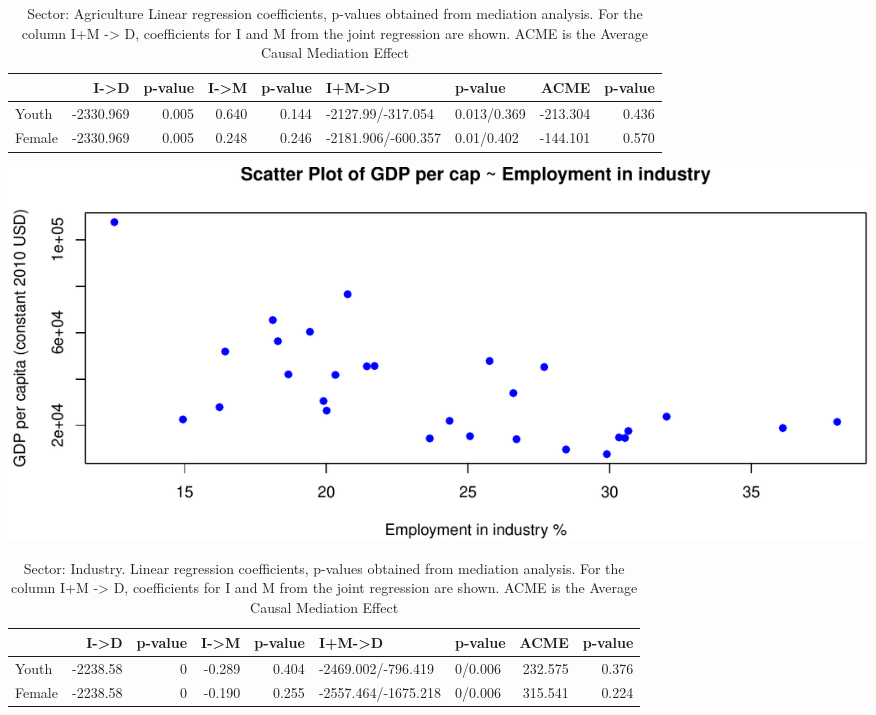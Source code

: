 \documentclass[
]{article}
\begin{document}
\begin{table}

\caption{\label{tab:mediation_agr}Sector: Agriculture Linear regression coefficients, p-values obtained from mediation analysis. For the column I+M -> D, coefficients for I and M from the joint regression are shown. ACME is the Average Causal Mediation Effect}
\centering
\begin{tabular}[t]{l|r|r|r|r|l|l|r|r}
\hline
  & I->D & p-value & I->M & p-value & I+M->D & p-value & ACME & p-value\\
\hline
Youth & -2330.969 & 0.005 & 0.640 & 0.144 & -2127.99/-317.054 & 0.013/0.369 & -213.304 & 0.436\\
\hline
Female & -2330.969 & 0.005 & 0.248 & 0.246 & -2181.906/-600.357 & 0.01/0.402 & -144.101 & 0.570\\
\hline
\end{tabular}
\end{table}

\includegraphics{main_files/figure-latex/mediation_ind-1.pdf}

\begin{table}

\caption{\label{tab:mediation_ind}Sector: Industry. Linear regression coefficients, p-values obtained from mediation analysis. For the column I+M -> D, coefficients for I and M from the joint regression are shown. ACME is the Average Causal Mediation Effect}
\centering
\begin{tabular}[t]{l|r|r|r|r|l|l|r|r}
\hline
  & I->D & p-value & I->M & p-value & I+M->D & p-value & ACME & p-value\\
\hline
Youth & -2238.58 & 0 & -0.289 & 0.404 & -2469.002/-796.419 & 0/0.006 & 232.575 & 0.376\\
\hline
Female & -2238.58 & 0 & -0.190 & 0.255 & -2557.464/-1675.218 & 0/0.006 & 315.541 & 0.224\\
\hline
\end{tabular}
\end{table}
\end{document}

